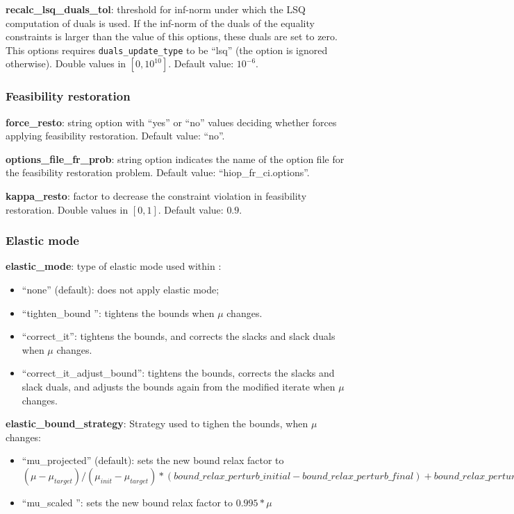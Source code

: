 \noindent \textbf{recalc\_lsq\_duals\_tol}: threshold for inf-norm under which the LSQ computation of duals is used. If the inf-norm of the duals of the equality constraints is larger than the value of this options, these duals are set to zero. This options requires \texttt{duals\_update\_type} to be ``lsq'' (the option is ignored otherwise). Double values in $[0,10^{10}]$. Default value: $10^{-6}$.
\medskip



\subsubsection{Feasibility restoration}

\noindent \textbf{force\_resto}: string option with ``yes'' or ``no'' values deciding whether \Hi forces applying feasibility restoration. Default value: ``no''.
\medskip

\noindent \textbf{options\_file\_fr\_prob}: string option indicates the name of the option file for the feasibility restoration problem. Default value: ``hiop\_fr\_ci.options''.
\medskip

\noindent \textbf{kappa\_resto}: factor to decrease the constraint violation in feasibility restoration. Double values in $[0, 1]$. Default value: $0.9$.
\medskip



\subsubsection{Elastic mode}

\noindent \textbf{elastic\_mode}: type of elastic mode used within \Hi:
\begin{itemize}
\item ``none'' (default): does not apply elastic mode;
\item ``tighten\_bound '': tightens the bounds when $\mu$ changes.
\item ``correct\_it'': tightens the bounds, and corrects the slacks and slack duals when $\mu$ changes.
\item ``correct\_it\_adjust\_bound'': tightens the bounds, corrects the slacks and slack duals, and adjusts the bounds again from the modified iterate when $\mu$ changes.
\end{itemize}
\medskip

\noindent \textbf{elastic\_bound\_strategy}: Strategy used to tighen the bounds, when $\mu$ changes:
\begin{itemize}
\item ``mu\_projected'' (default): sets the new bound relax factor to \\
$(\mu-\mu_{target}) / (\mu_{init}-\mu_{target}) * ({bound\_relax\_perturb\_initial}-{bound\_relax\_perturb\_final}) + {bound\_relax\_perturb\_final}$ 
\item ``mu\_scaled '': sets the new bound relax factor to $0.995*\mu$
\end{itemize}
\medskip

